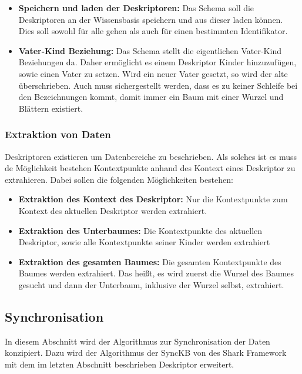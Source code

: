 \documentclass[a4paper]{article}
\begin{document}
	\newpage
	\begin{itemize}
		\item \textbf{Speichern und laden der Deskriptoren:} Das Schema soll die
		 Deskriptoren an der Wissensbasis speichern und aus dieser laden können.
		 Dies soll sowohl für alle gehen als auch für einen bestimmten
		 Identifikator.
		\item \textbf{Vater-Kind Beziehung:} Das Schema stellt die eigentlichen
		Vater-Kind Beziehungen da. Daher ermöglicht es einem Deskriptor Kinder
		hinzuzufügen, sowie einen Vater zu setzen. Wird ein neuer Vater gesetzt,
		so wird der alte überschrieben. Auch muss sichergestellt werden, dass
		es zu keiner Schleife bei den Bezeichnungen kommt, damit immer ein Baum
		mit einer Wurzel und Blättern existiert.
	\end{itemize}
	
	\subsubsection{Extraktion von Daten}
	\label{sec:extraction}
	
	Deskriptoren existieren um Datenbereiche zu beschrieben. Als solches ist es
	muss de Möglichkeit bestehen Kontextpunkte anhand des Kontext eines Deskriptor
	zu extrahieren. Dabei sollen die folgenden Möglichkeiten bestehen:
	
	\begin{itemize}
		\item \textbf{Extraktion des Kontext des Deskriptor:} Nur die Kontextpunkte
		zum Kontext des aktuellen Deskriptor werden extrahiert.
		\item \textbf{Extraktion des Unterbaumes:} Die Kontextpunkte des aktuellen
		 Deskriptor, sowie alle Kontextpunkte seiner Kinder werden extrahiert
		\item \textbf{Extraktion des gesamten Baumes:} Die gesamten Kontextpunkte
		des Baumes werden extrahiert. Das heißt, es wird zuerst die Wurzel des
		Baumes gesucht und dann der Unterbaum, inklusive der Wurzel selbst,
		extrahiert.
	\end{itemize}
	
	\subsection{Synchronisation}
	
	In diesem Abschnitt wird der Algorithmus zur Synchronisation der Daten
	konzipiert. Dazu wird der Algorithmus der SyncKB von des Shark Framework 
	mit dem im letzten Abschnitt beschrieben Deskriptor erweitert.
	
\end{document}
